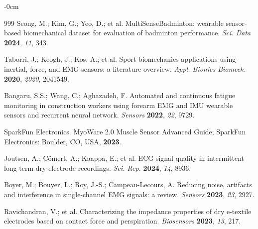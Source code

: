 \documentclass[sensors,article,submit,pdftex,moreauthors]{Definitions/mdpi}
\begin{document}
\begin{adjustwidth}{-\extralength}{0cm}
\begin{thebibliography}{999}
Seong, M.; Kim, G.; Yeo, D.; et al.
MultiSenseBadminton: wearable sensor-based biomechanical dataset for evaluation of
badminton performance.
{\em Sci. Data}
{\bf 2024}, {\em 11}, 343.

Taborri, J.; Keogh, J.; Kos, A.; et al.
Sport biomechanics applications using inertial, force, and EMG sensors:
a literature overview.
{\em Appl. Bionics Biomech.}
{\bf 2020}, {\em 2020}, 2041549.

Bangaru, S.S.; Wang, C.; Aghazadeh, F.
Automated and continuous fatigue monitoring in construction workers using forearm
EMG and IMU wearable sensors and recurrent neural network.
{\em Sensors}
{\bf 2022}, {\em 22}, 9729.

SparkFun Electronics.
MyoWare 2.0 Muscle Sensor Advanced Guide;
SparkFun Electronics: Boulder, CO, USA,
{\bf 2023}.

Joutsen, A.; C\"{o}mert, A.; Kaappa, E.; et al.
ECG signal quality in intermittent long-term dry electrode recordings.
{\em Sci. Rep.}
{\bf 2024}, {\em 14}, 8936.

Boyer, M.; Bouyer, L.; Roy, J.-S.; Campeau-Lecours, A.
Reducing noise, artifacts and interference in single-channel EMG signals: a review.
{\em Sensors}
{\bf 2023}, {\em 23}, 2927.

Ravichandran, V.; et al.
Characterizing the impedance properties of dry e-textile electrodes based on contact
force and perspiration.
{\em Biosensors}
{\bf 2023}, {\em 13}, 217.

\end{thebibliography}

\end{adjustwidth}
\end{document}
